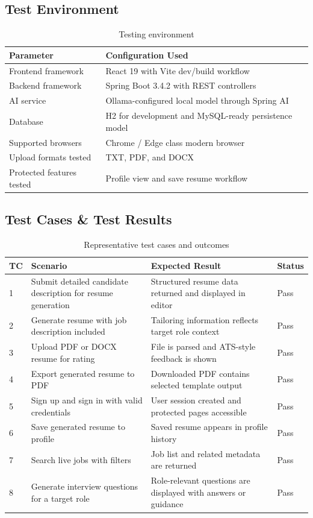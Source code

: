 \subsection{Test Environment}
\begin{table}[H]
\centering
\caption{Testing environment}
\begin{tabular}{|p{4.2cm}|p{7.2cm}|}
\hline
\textbf{Parameter} & \textbf{Configuration Used} \\
\hline
Frontend framework & React 19 with Vite dev/build workflow \\
\hline
Backend framework & Spring Boot 3.4.2 with REST controllers \\
\hline
AI service & Ollama-configured local model through Spring AI \\
\hline
Database & H2 for development and MySQL-ready persistence model \\
\hline
Supported browsers & Chrome / Edge class modern browser \\
\hline
Upload formats tested & TXT, PDF, and DOCX \\
\hline
Protected features tested & Profile view and save resume workflow \\
\hline
\end{tabular}
\end{table}

\subsection{Test Cases \& Test Results}
\begin{table}[H]
\centering
\caption{Representative test cases and outcomes}
\begin{tabular}{|p{0.9cm}|p{4.6cm}|p{4.2cm}|p{1.4cm}|}
\hline
\textbf{TC} & \textbf{Scenario} & \textbf{Expected Result} & \textbf{Status} \\
\hline
1 & Submit detailed candidate description for resume generation & Structured resume data returned and displayed in editor & Pass \\
\hline
2 & Generate resume with job description included & Tailoring information reflects target role context & Pass \\
\hline
3 & Upload PDF or DOCX resume for rating & File is parsed and ATS-style feedback is shown & Pass \\
\hline
4 & Export generated resume to PDF & Downloaded PDF contains selected template output & Pass \\
\hline
5 & Sign up and sign in with valid credentials & User session created and protected pages accessible & Pass \\
\hline
6 & Save generated resume to profile & Saved resume appears in profile history & Pass \\
\hline
7 & Search live jobs with filters & Job list and related metadata are returned & Pass \\
\hline
8 & Generate interview questions for a target role & Role-relevant questions are displayed with answers or guidance & Pass \\
\hline
\end{tabular}
\end{table}

